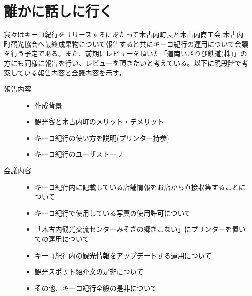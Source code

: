 \section{誰かに話しに行く}
我々はキーコ紀行をリリースするにあたって木古内町長と木古内商工会 木古内町観光協会へ最終成果物について報告すると共にキーコ紀行の運用について会議を行う予定である。また、前期にレビューを頂いた「道南いさりび鉄道(株)」の方にも同様に報告を行い、レビューを頂きたいと考えている。以下に現段階で考案している報告内容と会議内容を示す。
\begin{description}
 \item[報告内容]\mbox{}
 	\begin{itemize}
	\item 作成背景
	\item 観光客と木古内町のメリット・デメリット
	\item キーコ紀行の使い方を説明(プリンター持参)
	\item キーコ紀行のユーザストーリ \\
	\end{itemize}
 \item[会議内容]\mbox{}
	\begin{itemize}
	\item キーコ紀行内に記載している店舗情報をお店から直接収集することについて
	\item キーコ紀行で使用している写真の使用許可について
	\item 「木古内観光交流センターみそぎの郷きこない」にプリンターを置いての運用について
	\item キーコ紀行内の観光情報をアップデートする運用について
	\item 観光スポット紹介文の是非について
	\item その他、キーコ紀行全般の是非について
	\end{itemize}
\end{description}

